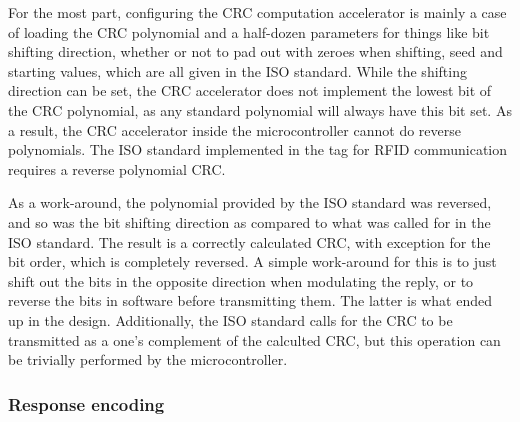For the most part, configuring the CRC computation accelerator is mainly a case of loading the
CRC polynomial and a half-dozen parameters for things like bit shifting direction, whether or not to pad
out with zeroes when shifting, seed and starting values, which are all given in the ISO standard.
While the shifting direction can be set, the CRC
accelerator does not implement the lowest bit of the CRC polynomial, as any standard polynomial will always have
this bit set. As a result, the CRC accelerator inside the microcontroller cannot do reverse polynomials.
The ISO standard implemented in the tag for RFID communication requires a reverse polynomial CRC.

As a work-around, the polynomial provided by the ISO standard was reversed, and so was the bit shifting
direction as compared to what was called for in the ISO standard. The result is a correctly calculated
CRC, with exception for the bit order, which is completely reversed. A simple work-around for this is to
just shift out the bits in the opposite direction when modulating the reply, or to reverse the bits
in software before transmitting them. The latter is what ended up in the design. Additionally, the ISO standard
calls for the CRC to be transmitted as a one's complement of the calculted CRC, but this operation
can be trivially performed by the microcontroller.


\subsubsection{Response encoding}
